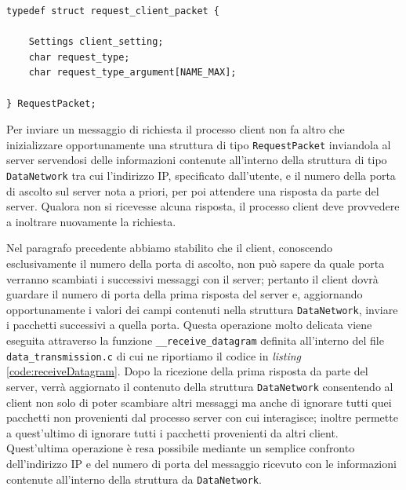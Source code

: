 \documentclass[10pt,a4paper, titlepage]{report}
\begin{document}
\begin{lstlisting}[frame=lines, caption={Implementazione della struttura \texttt{RequestPacket}}, label={code:RequestPacket}]
typedef struct request_client_packet {

	Settings client_setting;
	char request_type;
	char request_type_argument[NAME_MAX];

} RequestPacket;
\end{lstlisting}

Per inviare un messaggio di richiesta il processo client non fa altro che inizializzare opportunamente una struttura di tipo \texttt{RequestPacket} inviandola al server servendosi delle informazioni contenute all'interno della struttura di tipo \texttt{DataNetwork} tra cui l'indirizzo IP, specificato dall'utente, e il numero della porta di ascolto sul server nota a priori, per poi attendere una risposta da parte del server. Qualora non si ricevesse alcuna risposta, il processo client deve provvedere a inoltrare nuovamente la richiesta.

Nel paragrafo precedente abbiamo stabilito che il client, conoscendo esclusivamente il numero della porta di ascolto, non può sapere da quale porta verranno scambiati i successivi messaggi con il server; pertanto il client dovrà guardare il numero di porta della prima risposta del server e, aggiornando opportunamente i valori dei campi contenuti nella struttura \texttt{DataNetwork}, inviare i pacchetti successivi a quella porta. Questa operazione molto delicata viene eseguita attraverso la funzione \texttt{\_\_receive\_datagram} definita all'interno del file \texttt{data\_transmission.c} di cui ne riportiamo il codice in \textit{listing} \ref{code:receiveDatagram}. Dopo la ricezione della prima risposta da parte del server, verrà aggiornato il contenuto della struttura \texttt{DataNetwork} consentendo al client non solo di poter scambiare altri messaggi ma anche di ignorare tutti quei pacchetti non provenienti dal processo server con cui interagisce; inoltre permette a quest'ultimo di ignorare tutti i pacchetti provenienti da altri client. Quest'ultima operazione è resa possibile mediante un semplice confronto dell'indirizzo IP e del numero di porta del messaggio ricevuto con le informazioni contenute all'interno della struttura da \texttt{DataNetwork}. 
\end{document}
